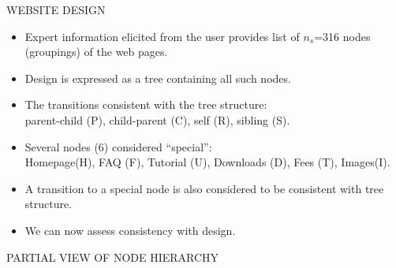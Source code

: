 \documentclass{report}
\newcommand{\head}[1]
{
  \begin{center}
      {\huge {\color{blue} #1}}
    \end{center}
  }
\newcommand{\figone}[1]
{
  \begin{center}
    {{\resizebox*{0.95\textwidth}{0.7\textheight}
        {\rotatebox{360}{\texttt{[image: \#1]}}}} \par}
  \end{center}
  }
\begin{document}
\newpage \head{WEBSITE DESIGN}
\begin{itemize}
\item Expert information elicited from the user provides
 list of $n_s$=316 nodes (groupings) of the web pages.
\item Design is expressed as a tree containing all such nodes.
\item The transitions consistent with the tree structure:\\
parent-child (P), child-parent (C), self (R), sibling (S).
\item Several nodes (6) considered ``special'':\\
Homepage(H), FAQ (F), Tutorial (U), Downloads (D), Fees (T), Images(I).
\item A transition to a special node is also considered to be consistent with tree structure.
\item We can now assess consistency with design.
\end{itemize}
\newpage \head{PARTIAL VIEW OF NODE HIERARCHY}
\vspace{1in}
\figone{treepic4.jpg}
\end{document}
